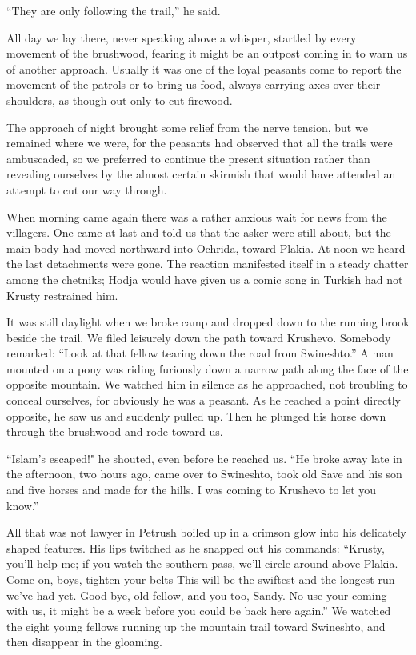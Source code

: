 \documentclass[a5paper,12pt]{book}
\begin{document}
“They are only following the trail,” he said.

All day we lay there, never speaking above a whisper, startled by every movement of the brushwood, fearing it might be an outpost coming in to warn us of another approach. Usually it was one of the loyal peasants come to report the movement of the patrols or to bring us food, always carrying axes over their shoulders, as though out only to cut firewood.

The approach of night brought some relief from the nerve tension, but we remained where we were, for the peasants had observed that all the trails were ambuscaded, so we preferred to continue the present situation rather than revealing ourselves by the almost certain skirmish that would have attended an attempt to cut our way through.

When morning came again there was a rather anxious wait for news from the villagers. One came at last and told us that the asker were still about, but the main body had moved northward into Ochrida, toward Plakia. At noon we heard the last detachments were gone. The reaction manifested itself in a steady chatter among the chetniks; Hodja would have given us a comic song in Turkish had not Krusty restrained him.

It was still daylight when we broke camp and dropped down to the running brook beside the trail. We filed leisurely down the path toward Krushevo. Somebody remarked: “Look at that fellow tearing down the road from Swineshto.” A man mounted on a pony was riding furiously down a narrow path along the face of the opposite mountain. We watched him in silence as he approached, not troubling to conceal ourselves, for obviously he was a peasant. As he reached a point directly opposite, he saw us and suddenly pulled up. Then he plunged his horse down through the brushwood and rode toward us.

“Islam's escaped!" he shouted, even before he reached us. “He broke away late in the afternoon, two hours ago, came over to Swineshto, took old Save and his son and five horses and made for the hills. I was coming to Krushevo to let you know.”

All that was not lawyer in Petrush boiled up in a crimson glow into his delicately shaped features. His lips twitched as he snapped out his commands: “Krusty, you'll help me; if you watch the southern pass, we'll circle around above Plakia. Come on, boys, tighten your belts This will be the swiftest and the longest run we've had yet. Good-bye, old fellow, and you too, Sandy. No use your coming with us, it might be a week before you could be back here again.” We watched the eight young fellows running up the mountain trail toward Swineshto, and then disappear in the gloaming.
\end{document}

